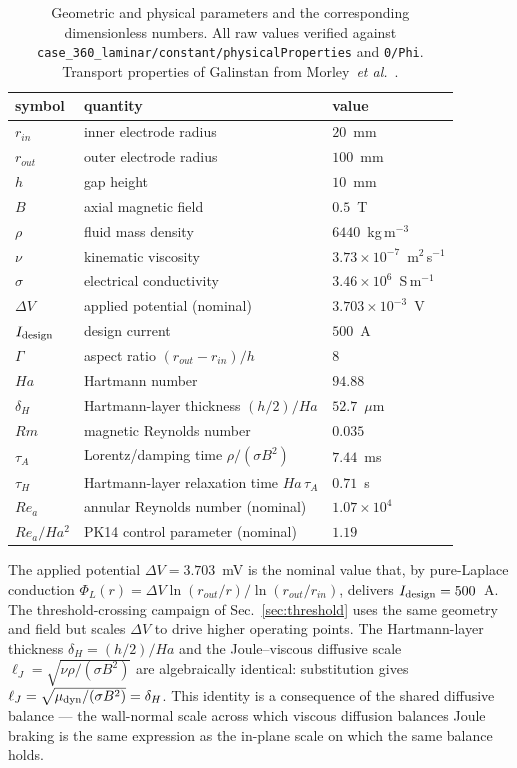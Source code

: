 \documentclass[aps,prl,twocolumn,superscriptaddress]{revtex4-2}
\begin{document}
\begin{table}[h!]
\centering
\caption{Geometric and physical parameters and the corresponding
dimensionless numbers.  All raw values verified against
\texttt{case\_360\_laminar/constant/physicalProperties} and
\texttt{0/Phi}.  Transport properties of Galinstan from
Morley~\textit{et al.}~\cite{12}.}
\label{tab:params}
\begin{tabular}{|l|l|l|}\hline
symbol & quantity & value \\ \hline
$r_{in}$ & inner electrode radius & $20$~mm \\
$r_{out}$ & outer electrode radius & $100$~mm \\
$h$ & gap height & $10$~mm \\
$B$ & axial magnetic field & $0.5$~T \\
$\rho$ & fluid mass density & $6440$~kg\,m$^{-3}$ \\
$\nu$ & kinematic viscosity & $3.73\!\times\!10^{-7}$~m$^2$\,s$^{-1}$ \\
$\sigma$ & electrical conductivity & $3.46\!\times\!10^{6}$~S\,m$^{-1}$ \\
$\Delta V$ & applied potential (nominal) & $3.703\!\times\!10^{-3}$~V \\
$I_{\rm design}$ & design current & $500$~A \\ \hline
$\Gamma$ & aspect ratio $(r_{out}-r_{in})/h$ & $8$ \\
$Ha$ & Hartmann number & $94.88$ \\
$\delta_H$ & Hartmann-layer thickness $(h/2)/Ha$ & $52.7$~$\mu$m \\
$Rm$ & magnetic Reynolds number & $0.035$ \\
$\tau_A$ & Lorentz/damping time $\rho/(\sigma B^{2})$ & $7.44$~ms \\
$\tau_H$ & Hartmann-layer relaxation time $Ha\,\tau_A$ & $0.71$~s \\
$Re_a$ & annular Reynolds number (nominal) & $1.07\!\times\!10^{4}$ \\
$Re_a/Ha^{2}$ & PK14 control parameter (nominal) & $1.19$ \\ \hline
\end{tabular}
\end{table}

The applied potential $\Delta V = 3.703$~mV is the nominal value
that, by pure-Laplace conduction $\Phi_L(r) = \Delta V \ln(r_{out}/r) /
\ln(r_{out}/r_{in})$, delivers $I_{\rm design} = 500$~A.  The
threshold-crossing campaign of Sec.~\ref{sec:threshold} uses the same
geometry and field but scales $\Delta V$ to drive higher operating
points.  The Hartmann-layer thickness $\delta_H = (h/2)/Ha$ and the
Joule--viscous diffusive scale $\ell_J = \sqrt{\nu\rho/(\sigma B^{2})}$
are algebraically identical: substitution gives
$\ell_J = \sqrt{\mu_{\rm dyn}/(\sigma B^{2})} = \delta_H$.  This
identity is a consequence of the shared diffusive balance --- the
wall-normal scale across which viscous diffusion balances Joule
braking is the same expression as the in-plane scale on which the
same balance holds.
\end{document}
